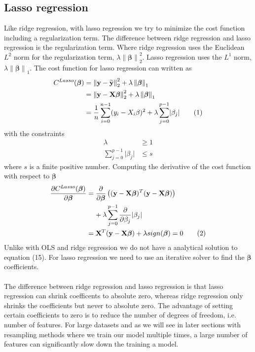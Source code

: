 \documentclass[a4paper,twocolumn]{article}
\newcommand\numberthis{\addtocounter{equation}{1}\tag{\theequation}}
\newcommand{\y}{\mathbf{y}}
\newcommand{\ytilde}{\mathbf{\widetilde{y}}}
\newcommand{\X}{\mathbf{X}}
\newcommand{\B}{\boldsymbol{\beta}}
\newcommand{\norm}[1]{\left\lVert#1\right\rVert}
\begin{document}
\subsection{Lasso regression}
Like ridge regression, with lasso regression we try to minimize the cost function including a regularization term. The difference between ridge regression and lasso regression is the regularization term. Where ridge regression uses the Euclidean $L^{2}$ norm for the regularization term, $\lambda\norm{\B}_{2}^{2}$. Lasso regression uses the $L^{1}$ norm, $\lambda\norm{\B}_{1}$. The cost function for lasso regression can written as
\begin{align*}
    C^{Lasso}(\B) &= \norm{\y - \ytilde}_{2}^{2} + \lambda\norm{\B}_{1}\\
    &= \norm{\y - \X\B}_{2}^{2} + \lambda\norm{\B}_{1}\\
    &= \frac{1}{n}\sum_{i=0}^{n-1}(y_{i} - X_{i}\beta )^{2} + \lambda\sum_{j=0}^{p-1}\lvert\beta_{j}\rvert\numberthis\label{eqn}
\end{align*}
with the constraints
\begin{align*}
    \lambda &\geq 1\\
    \sum_{j=0}^{p-1}\lvert\beta_{j}\rvert &\leq s
\end{align*}
where $s$ is a finite positive number. Computing the derivative of the cost function with respect to $\B$
\begin{align*}
    \frac{\partial C^{Lasso}(\B)}{\partial \B} &= \frac{\partial}{\partial \B}\left((\y - \X\B)^{T}(\y - \X\B)\right) \\&
    \hspace{0.4cm}+ \lambda\sum_{j=0}^{p-1}\frac{\partial}{\partial \beta_{j}}\lvert\beta_{j}\rvert\\
    &= \X^{T}(\y - \X\B) + \lambda sign(\B) = 0\numberthis\label{eqn}
\end{align*}
Unlike with OLS and ridge regression we do not have a analytical solution to equation (15). For lasso regression we need to use an iterative solver to find the $\B$ coefficients. \\
\\
The difference between ridge regression and lasso regression is that lasso regression can shrink coefficents to absolute zero, whereas ridge regression only shrinks the coefficients but never to absolute zero. The advantage of setting certain coefficients to zero is to reduce the number of degrees of freedom, i.e. number of features\cite{ridge1, ridge2}. For large datasets and as we will see in later sections with resampling methods where we train our model multiple times, a large number of features can significantly slow down the training a model.
\end{document}
